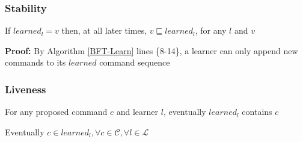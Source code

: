 \subsubsection{Stability}
\begin{theorem}
If $learned_l = v$ then, at all later times, $v \sqsubseteq learned_l$, for any $l$ and $v$ \par \label{S-T1}
\end{theorem} 
\textbf{Proof:} By Algorithm \ref{BFT-Learn} lines \{8-14\}, a learner can only append new commands to its $learned$ command sequence

\subsubsection{Liveness}
\begin{theorem}
For any proposed command $c$ and learner $l$, eventually $learned_l$ contains $c$ \label{key}\par
\end{theorem} 

Eventually $c \in learned_l, \forall c \in \mathcal{C}, \forall l \in \mathcal{L}$ \label{L-T1}\par